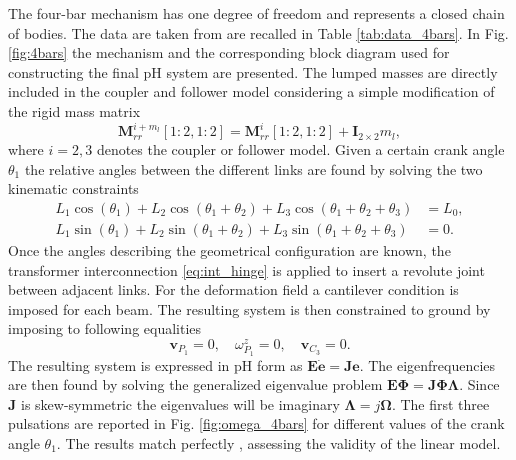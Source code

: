 \documentclass{svjour3}                     %
\begin{document}
The four-bar mechanism has one degree of freedom and represents a closed chain of bodies. The data are taken from \cite{KITIS1990267,Chebbi2017} are recalled in Table \ref{tab:data_4bars}. In Fig. \ref{fig:4bars} the mechanism and the corresponding block diagram used for constructing the final pH system are presented. The lumped masses are directly included in the coupler and follower model considering a simple modification of the rigid mass matrix
\begin{equation}
\mathbf{M}_{rr}^{i + m_l}[1:2,1:2] = \mathbf{M}_{rr}^{i}[1:2,1:2] + \mathbf{I}_{2\times 2} m_l,
\end{equation} 
where $i=2,3$ denotes the coupler or follower model. Given a certain crank angle $\theta_1$ the relative angles between the different links are found by solving the two kinematic constraints
\begin{align*}
L_1 \cos(\theta_1)+ L_2 \cos(\theta_1+\theta_2)+ L_3 \cos(\theta_1+\theta_2+\theta_3) &=L_0, \\
L_1 \sin(\theta_1)+L_2 \sin(\theta_1+\theta_2)+L_3 \sin(\theta_1+\theta_2+\theta_3) &=0.
\end{align*} 
Once the angles describing the geometrical configuration are known, the transformer interconnection \eqref{eq:int_hinge} is applied to insert a revolute joint between adjacent links. For the deformation field a cantilever condition is imposed for each beam. The resulting system is then constrained to ground by imposing to following equalities
\begin{equation*}
\mathbf{v}_{P_1} = 0, \quad \omega^z_{P_1} = 0, \quad \mathbf{v}_{C_3} = 0.
\end{equation*}
The resulting system is expressed in pH form as $\mathbf{E}\dot{\mathbf{e}} = \mathbf{J} \mathbf{e}$. The eigenfrequencies are then found by solving the generalized eigenvalue problem $\mathbf{E}\bm{\Phi} = \mathbf{J} \bm{\Phi \Lambda}$. Since $\mathbf{J}$ is skew-symmetric the eigenvalues will be imaginary $\bm{\Lambda} = j \bm{\Omega}$. The first three pulsations  are reported in Fig. \ref{fig:omega_4bars} for different values of the crank angle $\theta_1$. The results match perfectly \cite{KITIS1990267,Chebbi2017}, assessing the validity of the linear model.
\end{document}
